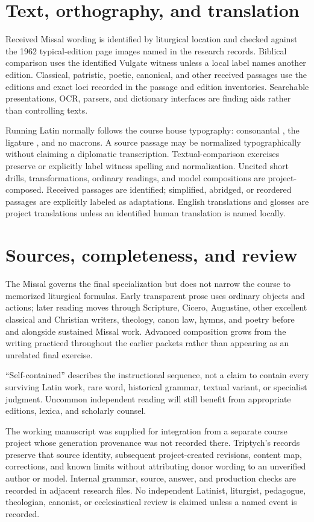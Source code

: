 \section{Text, orthography, and translation}

Received Missal wording is identified by liturgical location and checked
against the 1962 typical-edition page images named in the research records.
Biblical comparison uses the identified Vulgate witness unless a local label
names another edition. Classical, patristic, poetic, canonical, and other
received passages use the editions and exact loci recorded in the passage and
edition inventories. Searchable presentations, OCR, parsers, and dictionary
interfaces are finding aids rather than controlling texts.

Running Latin normally follows the course house typography: consonantal
, the ligature , and no macrons. A source passage may be
normalized typographically without claiming a diplomatic transcription.
Textual-comparison exercises preserve or explicitly label witness spelling and
normalization. Uncited short drills, transformations, ordinary readings, and
model compositions are project-composed. Received passages are identified;
simplified, abridged, or reordered passages are explicitly labeled as
adaptations. English translations and glosses are project translations unless
an identified human translation is named locally.

\section{Sources, completeness, and review}

The Missal governs the final specialization but does not narrow the course to
memorized liturgical formulas. Early transparent prose uses ordinary objects
and actions; later reading moves through Scripture, Cicero, Augustine, other
excellent classical and Christian writers, theology, canon law, hymns, and
poetry before and alongside sustained Missal work. Advanced composition grows
from the writing practiced throughout the earlier packets rather than appearing
as an unrelated final exercise.

“Self-contained” describes the instructional sequence, not a claim to contain
every surviving Latin work, rare word, historical grammar, textual variant, or
specialist judgment. Uncommon independent reading will still benefit from
appropriate editions, lexica, and scholarly counsel.

The working manuscript was supplied for integration from a separate course
project whose generation provenance was not recorded there. Triptych's records
preserve that source identity, subsequent project-created revisions, content
map, corrections, and known limits without attributing donor wording to an
unverified author or model. Internal grammar, source, answer, and production
checks are recorded in adjacent research files. No independent Latinist,
liturgist, pedagogue, theologian, canonist, or ecclesiastical review is claimed
unless a named event is recorded.

